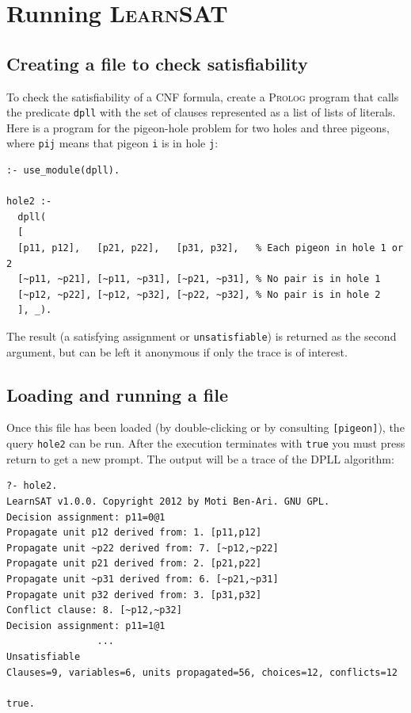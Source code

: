 \documentclass[11pt]{article}
\newcommand*{\p}[1]{\textup{\texttt{#1}}}
\newcommand*{\ls}{\textsc{LearnSAT}}
\newcommand*{\pl}{\textsc{Prolog}}
\begin{document}
\section{Running \ls}

\subsection{Creating a file to check satisfiability}

To check the satisfiability of a CNF formula, create a \pl{} program
that calls the predicate \p{dpll} with the set of clauses represented as
a list of lists of literals. Here is a program for the pigeon-hole
problem for two holes and three pigeons, where \p{pij} means that pigeon
\p{i} is in hole \p{j}:

\begin{verbatim}
:- use_module(dpll).

hole2 :-
  dpll(
  [
  [p11, p12],   [p21, p22],   [p31, p32],   % Each pigeon in hole 1 or 2 
  [~p11, ~p21], [~p11, ~p31], [~p21, ~p31], % No pair is in hole 1
  [~p12, ~p22], [~p12, ~p32], [~p22, ~p32], % No pair is in hole 2
  ], _).
\end{verbatim}

The result (a satisfying assignment or \p{unsatisfiable}) is returned as
the second argument, but can be left it anonymous if only the trace is
of interest.

\subsection{Loading and running a file}

Once this file has been loaded (by double-clicking or by consulting
\p{[pigeon]}), the query \p{hole2} can be run. After the execution
terminates with \p{true} you must press return to get a new prompt. The
output will be a trace of the DPLL algorithm:

\begin{verbatim}
?- hole2.
LearnSAT v1.0.0. Copyright 2012 by Moti Ben-Ari. GNU GPL.
Decision assignment: p11=0@1
Propagate unit p12 derived from: 1. [p11,p12]
Propagate unit ~p22 derived from: 7. [~p12,~p22]
Propagate unit p21 derived from: 2. [p21,p22]
Propagate unit ~p31 derived from: 6. [~p21,~p31]
Propagate unit p32 derived from: 3. [p31,p32]
Conflict clause: 8. [~p12,~p32]
Decision assignment: p11=1@1
                ...
Unsatisfiable
Clauses=9, variables=6, units propagated=56, choices=12, conflicts=12

true.
\end{verbatim}
\end{document}
